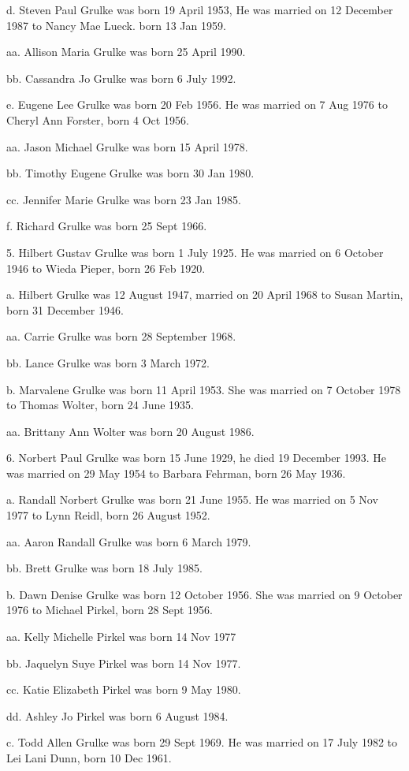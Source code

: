 \documentclass[a4paper]{article}
\begin{document}
d. Steven Paul Grulke was born 19 April 1953, He was married on 12 December 1987 to Nancy Mae Lueck. born 13 Jan 1959. 

aa. Allison Maria Grulke was born 25 April 1990.

bb. Cassandra Jo Grulke was born 6 July 1992.

e. Eugene Lee Grulke was born 20 Feb 1956.  He was married on 7 Aug 1976 to Cheryl Ann Forster, born 4 Oct 1956.

aa. Jason Michael Grulke was born 15 April 1978.

bb. Timothy Eugene Grulke was born 30 Jan 1980.

cc. Jennifer Marie Grulke was born 23 Jan 1985.

f. Richard Grulke was born 25 Sept 1966.

5. Hilbert Gustav Grulke was born 1 July 1925.  He was married on 6 October 1946 to Wieda Pieper, born 26 Feb 1920.  

a. Hilbert Grulke was 12 August 1947, married on 20 April 1968 to Susan Martin, born 31 December 1946.

aa. Carrie Grulke was born 28 September 1968.

bb. Lance Grulke was born 3 March 1972.

b. Marvalene Grulke was born 11 April 1953.  She was married on 7 October 1978 to Thomas Wolter, born 24 June 1935.  

aa. Brittany Ann Wolter was born 20 August 1986.

6. Norbert Paul Grulke was born 15 June 1929, he died 19 December 1993. He was married on 29 May 1954 to Barbara Fehrman, born 26 May 1936.

a. Randall Norbert Grulke was born 21 June 1955.  He was married on 5 Nov 1977 to Lynn Reidl, born 26 August 1952. 

aa. Aaron Randall Grulke was born 6 March 1979.

bb. Brett Grulke was born 18 July 1985.

b. Dawn Denise Grulke was born 12 October 1956.  She was married on 9 October 1976 to Michael Pirkel, born 28 Sept 1956.

aa. Kelly Michelle Pirkel was born 14 Nov 1977

bb. Jaquelyn Suye Pirkel was born 14 Nov 1977.
				
cc.  Katie Elizabeth Pirkel was born 9 May 1980.

dd. Ashley Jo Pirkel was born 6 August 1984.

c. Todd Allen Grulke was born 29 Sept 1969.  He was married on 17 July 1982 to Lei Lani Dunn, born 10 Dec 1961.
\end{document}
